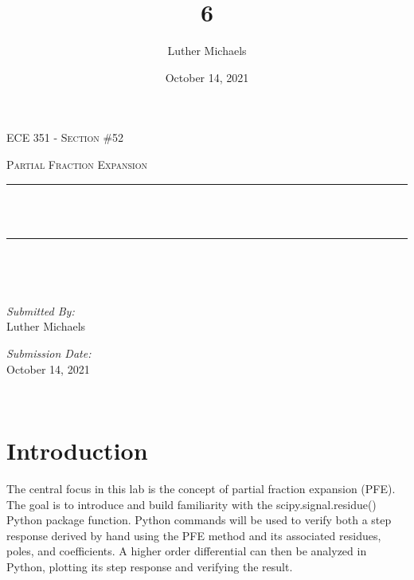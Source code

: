 \documentclass[12pt]{report}
\title{6}	%
\author{Luther Michaels}	%
\date{October 14, 2021}   %
\makeatletter
\let\thetitle\@title
\makeatother
\begin{document}
	
\begin{titlepage}
	\centering
	\vspace*{0.5 cm}
		
	\begin{center}    
		\textsc{\Large   ECE 351 - Section \#52}\\[2.0 cm]	
	\end{center}  
	\textsc{\Large Partial Fraction Expansion }\\[0.5 cm]
	\rule{\linewidth}{0.2 mm} \\[0.4 cm]
	{ \huge \bfseries \thetitle}\\
	\rule{\linewidth}{0.2 mm} \\[1.5 cm]
	\begin{minipage}{0.4\textwidth}
		\begin{flushleft} \large
		\end{flushleft}
	\end{minipage}~
	\begin{minipage}{0.4\textwidth}
		\begin{flushright} \large
			\emph{Submitted By:} \\
			Luther Michaels \break
				
			\emph{Submission Date:} \\
			October 14, 2021
		\end{flushright}
	\end{minipage}\\[2 cm]
\end{titlepage}
	
	
\tableofcontents
\pagebreak
	
\renewcommand{\thesection}{\arabic{section}}
\section{Introduction}

The central focus in this lab is the concept of partial fraction expansion (PFE). The goal is to introduce and build familiarity with the scipy.signal.residue() Python package function. Python commands will be used to verify both a step response derived by hand using the PFE method and its associated residues, poles, and coefficients. A higher order differential can then be analyzed in Python, plotting its step response and verifying the result. \\
\end{document}
